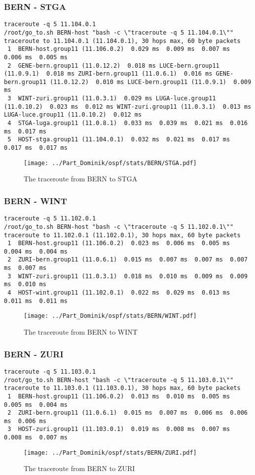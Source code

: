 \subsubsection{BERN - STGA}
\begin{lstlisting}
traceroute -q 5 11.104.0.1
/root/go_to.sh BERN-host "bash -c \"traceroute -q 5 11.104.0.1\""
traceroute to 11.104.0.1 (11.104.0.1), 30 hops max, 60 byte packets
 1  BERN-host.group11 (11.106.0.2)  0.029 ms  0.009 ms  0.007 ms  0.006 ms  0.005 ms
 2  GENE-bern.group11 (11.0.12.2)  0.018 ms LUCE-bern.group11 (11.0.9.1)  0.018 ms ZURI-bern.group11 (11.0.6.1)  0.016 ms GENE-bern.group11 (11.0.12.2)  0.010 ms LUCE-bern.group11 (11.0.9.1)  0.009 ms
 3  WINT-zuri.group11 (11.0.3.1)  0.029 ms LUGA-luce.group11 (11.0.10.2)  0.023 ms  0.012 ms WINT-zuri.group11 (11.0.3.1)  0.013 ms LUGA-luce.group11 (11.0.10.2)  0.012 ms
 4  STGA-luga.group11 (11.0.8.1)  0.033 ms  0.039 ms  0.021 ms  0.016 ms  0.017 ms
 5  HOST-stga.group11 (11.104.0.1)  0.032 ms  0.021 ms  0.017 ms  0.017 ms  0.017 ms
\end{lstlisting}
\begin{figure}[H]
\centering
\texttt{[image: ../Part\_Dominik/ospf/stats/BERN/STGA.pdf]}
\caption{The traceroute from BERN to STGA}
\end{figure}
\clearpage
\subsubsection{BERN - WINT}
\begin{lstlisting}
traceroute -q 5 11.102.0.1
/root/go_to.sh BERN-host "bash -c \"traceroute -q 5 11.102.0.1\""
traceroute to 11.102.0.1 (11.102.0.1), 30 hops max, 60 byte packets
 1  BERN-host.group11 (11.106.0.2)  0.023 ms  0.006 ms  0.005 ms  0.004 ms  0.004 ms
 2  ZURI-bern.group11 (11.0.6.1)  0.015 ms  0.007 ms  0.007 ms  0.007 ms  0.007 ms
 3  WINT-zuri.group11 (11.0.3.1)  0.018 ms  0.010 ms  0.009 ms  0.009 ms  0.010 ms
 4  HOST-wint.group11 (11.102.0.1)  0.022 ms  0.029 ms  0.013 ms  0.011 ms  0.011 ms
\end{lstlisting}
\begin{figure}[H]
\centering
\texttt{[image: ../Part\_Dominik/ospf/stats/BERN/WINT.pdf]}
\caption{The traceroute from BERN to WINT}
\end{figure}
\clearpage
\subsubsection{BERN - ZURI}
\begin{lstlisting}
traceroute -q 5 11.103.0.1
/root/go_to.sh BERN-host "bash -c \"traceroute -q 5 11.103.0.1\""
traceroute to 11.103.0.1 (11.103.0.1), 30 hops max, 60 byte packets
 1  BERN-host.group11 (11.106.0.2)  0.013 ms  0.010 ms  0.005 ms  0.005 ms  0.004 ms
 2  ZURI-bern.group11 (11.0.6.1)  0.015 ms  0.007 ms  0.006 ms  0.006 ms  0.006 ms
 3  HOST-zuri.group11 (11.103.0.1)  0.019 ms  0.008 ms  0.007 ms  0.008 ms  0.007 ms
\end{lstlisting}
\begin{figure}[H]
\centering
\texttt{[image: ../Part\_Dominik/ospf/stats/BERN/ZURI.pdf]}
\caption{The traceroute from BERN to ZURI}
\end{figure}
\clearpage
